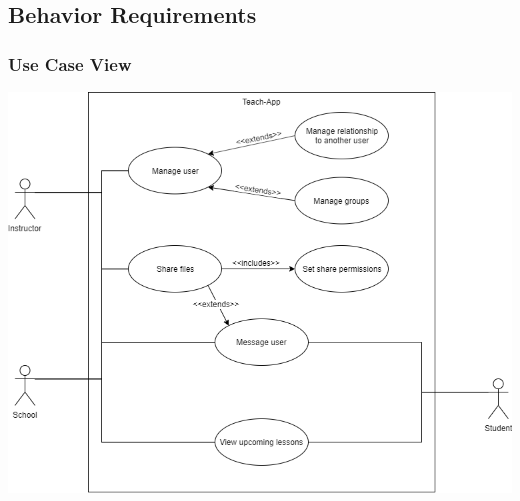     \subsection{Behavior Requirements}\label{sec:behavior-requirements}
        \subsubsection{Use Case View}\label{sec:use-case-view}
            \includegraphics[width=\textwidth]{images/Use-Case-Diagram.png}
